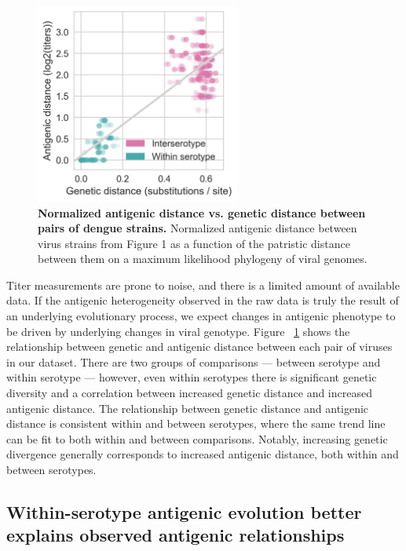 \documentclass[11pt,oneside,letterpaper]{article}
\begin{document}
\begin{figure}[h]
  \begin{centering}
  \includegraphics[width=0.6\textwidth]{../figures/png/genetic_antigenic_distance.png}
  	\caption{\textbf{Normalized antigenic distance vs. genetic distance between pairs of dengue strains.}  Normalized antigenic distance between virus strains from Figure 1 as a function of the patristic distance between them on a maximum likelihood phylogeny of viral genomes.}
  	\label{genetic_antigenic_distance}
  \end{centering}
\end{figure}

Titer measurements are prone to noise, and there is a limited amount of available data.
If the antigenic heterogeneity observed in the raw data is truly the result of an underlying evolutionary process, we expect changes in antigenic phenotype to be driven by underlying changes in viral genotype.
Figure ~\ref{genetic_antigenic_distance} shows the relationship between genetic and antigenic distance between each pair of viruses in our dataset.
There are two groups of comparisons --- between serotype and within serotype --- however, even within serotypes there is significant genetic diversity and a correlation between increased genetic distance and increased antigenic distance.
The relationship between genetic distance and antigenic distance is consistent within and between serotypes, where the same trend line can be fit to both within and between comparisons.
Notably, increasing genetic divergence generally corresponds to increased antigenic distance, both within and between serotypes.

\subsection{Within-serotype antigenic evolution better explains observed antigenic relationships}
\end{document}
